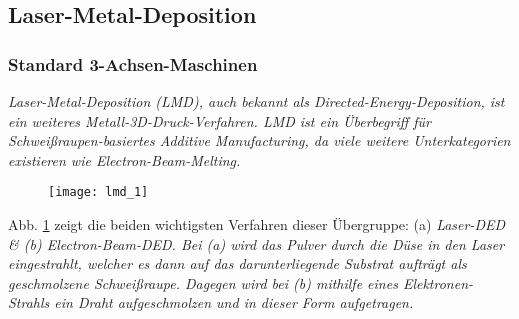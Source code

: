 \documentclass[../main.tex]{subfiles}
\begin{document}
\subsection{Laser-Metal-Deposition}
\subsubsection{Standard 3-Achsen-Maschinen}
\it{Laser-Metal-Deposition} (LMD), auch bekannt als \it{Directed-Energy-Deposition}, ist ein weiteres Metall-3D-Druck-Verfahren. LMD ist ein Überbegriff für Schweißraupen-basiertes \it{Additive Manufacturing}, da viele weitere Unterkategorien existieren wie \it{Electron-Beam-Melting}.
\begin{figure}[h]
	\begin{center}

		\texttt{[image: lmd\_1]}
\label{img:lmd_1}	
	\end{center}
\end{figure}
Abb. \ref{img:lmd_1} zeigt die beiden wichtigsten Verfahren dieser Übergruppe: (a) \it{Laser-DED} \& (b) \it{Electron-Beam-DED}.
Bei (a) wird das Pulver durch die Düse in den Laser eingestrahlt, welcher es dann auf das darunterliegende Substrat aufträgt als geschmolzene Schweißraupe. 
Dagegen wird bei (b) mithilfe eines Elektronen-Strahls ein Draht aufgeschmolzen und in dieser Form aufgetragen. \parencite{ALL3D_1}
\end{document}
